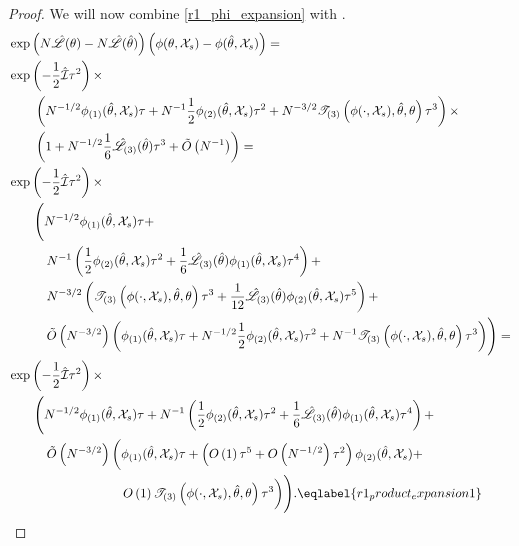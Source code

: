 \begin{lem}
\begin{proof}
We will now combine \eqref{r1_phi_expansion} with
.
%
\begin{align}
\MoveEqLeft
\exp\left(N \likhat(\theta) - N \likhat(\thetahat)\right)
\left(
    \phi(\theta, \xvec_s) - \phi(\thetahat, \xvec_s)
\right) = \nonumber \\
\MoveEqLeft
\exp\left(
    -\frac{1}{2} \infohat \tau^2
\right) \times \nonumber\\
&
\left(
    N^{-1/2} \phigrad{1}(\thetahat, \xvec_s) \tau +
    N^{-1} \frac{1}{2} \phigrad{2}(\thetahat, \xvec_s) \tau^2 +
    N^{-3/2} \tresid{3}{\phi(\cdot, \xvec_s), \thetahat, \theta} \tau^3
\right)  \times \nonumber\\
&
\left(
    1 +
    N^{-1/2} \frac{1}{6} \likhatk{3}(\thetahat) \tau^3 +
    \ordlog{N^{-1}}
\right) = \nonumber\\
\MoveEqLeft
\exp\left(
    -\frac{1}{2} \infohat \tau^2
\right) \times \nonumber\\
&
\Bigg(
    N^{-1/2} \phigrad{1}(\thetahat, \xvec_s) \tau +
\nonumber\\ &\quad
    N^{-1} \left(
        \frac{1}{2} \phigrad{2}(\thetahat, \xvec_s) \tau^2 +
        \frac{1}{6} \likhatk{3}(\thetahat) \phigrad{1}(\thetahat, \xvec_s) \tau^4 \right) +
\nonumber\\ &\quad
    N^{-3/2} \left(
        \tresid{3}{\phi(\cdot, \xvec_s), \thetahat, \theta} \tau^3 +
        \frac{1}{12} \likhatk{3}(\thetahat)  \phigrad{2}(\thetahat, \xvec_s) \tau^5
    \right) +
\nonumber\\ &\quad
    \ordlog{N^{-3/2}} \bigg(
        \phigrad{1}(\thetahat, \xvec_s) \tau +
        N^{-1/2}  \frac{1}{2} \phigrad{2}(\thetahat, \xvec_s) \tau^2 +
        N^{-1} \tresid{3}{\phi(\cdot, \xvec_s), \thetahat, \theta} \tau^3
    \bigg)
\Bigg) = \nonumber\\
\MoveEqLeft
\exp\left(
    -\frac{1}{2} \infohat \tau^2
\right) \times \nonumber\\
&
\Bigg(
    N^{-1/2} \phigrad{1}(\thetahat, \xvec_s) \tau +
    N^{-1} \left(
        \frac{1}{2} \phigrad{2}(\thetahat, \xvec_s) \tau^2 +
        \frac{1}{6} \likhatk{3}(\thetahat) \phigrad{1}(\thetahat, \xvec_s) \tau^4 \right) +
\nonumber\\ &\quad
    \ordlog{N^{-3/2}} \bigg(
        \phigrad{1}(\thetahat, \xvec_s) \tau +
        \left( \ord{1} \tau^5 + \ord{N^{-1/2}}  \tau^2\right)
            \phigrad{2}(\thetahat, \xvec_s) +
\nonumber\\ &\quad\quad\quad\quad\quad\quad\quad
        \ord{1} \tresid{3}{\phi(\cdot, \xvec_s), \thetahat, \theta} \tau^3
    \bigg)
\Bigg).
\eqlabel{r1_product_expansion1}
\end{align}


\end{proof}
\end{lem}
